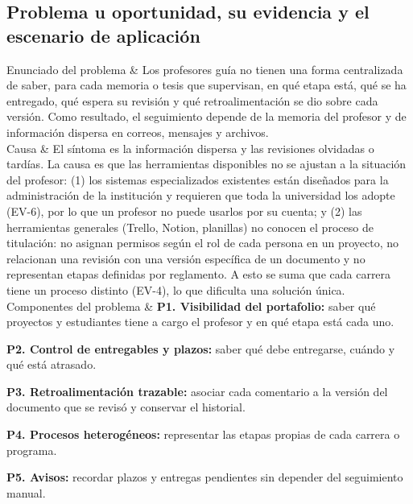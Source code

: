 \documentclass[10pt,a4paper]{article}
\newcommand{\nota}[1]{{\small\itshape\color{nota}#1\par}}
\newenvironment{kv}[1][4.6cm]
  {\footnotesize\setlength{\extrarowheight}{3pt}\xltabular{\linewidth}{|E{#1}|L|}\hline}
  {\endxltabular}
\newcommand{\kvrow}[2]{#1 & #2 \\ \hline}
\begin{document}
\subsection{Problema u oportunidad, su evidencia y el escenario de aplicación}
\begin{kv}[4.2cm]
\kvrow{Enunciado del problema}{Los profesores guía no tienen una forma centralizada de saber, para cada memoria o tesis que supervisan, en qué etapa está, qué se ha entregado, qué espera su revisión y qué retroalimentación se dio sobre cada versión. Como resultado, el seguimiento depende de la memoria del profesor y de información dispersa en correos, mensajes y archivos.}
\kvrow{Causa}{El síntoma es la información dispersa y las revisiones olvidadas o tardías. La causa es que las herramientas disponibles no se ajustan a la situación del profesor: (1) los sistemas especializados existentes están diseñados para la administración de la institución y requieren que toda la universidad los adopte (EV-6), por lo que un profesor no puede usarlos por su cuenta; y (2) las herramientas generales (Trello, Notion, planillas) no conocen el proceso de titulación: no asignan permisos según el rol de cada persona en un proyecto, no relacionan una revisión con una versión específica de un documento y no representan etapas definidas por reglamento. A esto se suma que cada carrera tiene un proceso distinto (EV-4), lo que dificulta una solución única.}
\kvrow{Componentes del problema}{%
\textbf{P1. Visibilidad del portafolio:} saber qué proyectos y estudiantes tiene a cargo el profesor y en qué etapa está cada uno.\par
\textbf{P2. Control de entregables y plazos:} saber qué debe entregarse, cuándo y qué está atrasado.\par
\textbf{P3. Retroalimentación trazable:} asociar cada comentario a la versión del documento que se revisó y conservar el historial.\par
\textbf{P4. Procesos heterogéneos:} representar las etapas propias de cada carrera o programa.\par
\textbf{P5. Avisos:} recordar plazos y entregas pendientes sin depender del seguimiento manual.}

\end{kv}
\end{document}
